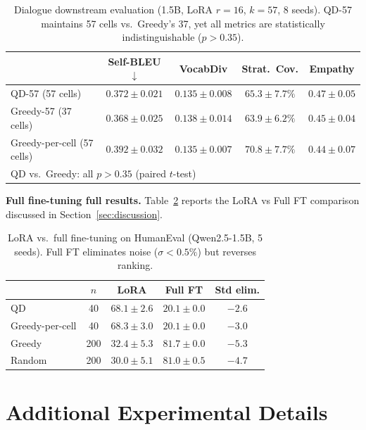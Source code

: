 \documentclass{article}
\theoremstyle{plain}
\theoremstyle{remark}
\begin{document}
\begin{table}[h]
\centering
\caption{Dialogue downstream evaluation (1.5B, LoRA $r{=}16$, $k{=}57$, 8 seeds). QD-57 maintains 57 cells vs.\ Greedy's 37, yet all metrics are statistically indistinguishable ($p{>}0.35$).}
\label{tab:dialogue_downstream}
\begin{tabular}{lcccc}
\toprule
 & \textbf{Self-BLEU}$\downarrow$ & \textbf{VocabDiv} & \textbf{Strat.\ Cov.} & \textbf{Empathy} \\
\midrule
QD-57 (57 cells) & $0.372 \pm 0.021$ & $0.135 \pm 0.008$ & $65.3 \pm 7.7\%$ & $0.47 \pm 0.05$ \\
Greedy-57 (37 cells) & $0.368 \pm 0.025$ & $0.138 \pm 0.014$ & $63.9 \pm 6.2\%$ & $0.45 \pm 0.04$ \\
Greedy-per-cell (57 cells) & $0.392 \pm 0.032$ & $0.135 \pm 0.007$ & $70.8 \pm 7.7\%$ & $0.44 \pm 0.07$ \\
\midrule
\multicolumn{5}{l}{\footnotesize QD vs.\ Greedy: all $p{>}0.35$ (paired $t$-test)} \\
\bottomrule
\end{tabular}
\end{table}

\textbf{Full fine-tuning full results.}
Table~\ref{tab:fullft} reports the LoRA vs Full FT comparison discussed in Section~\ref{sec:discussion}.

\begin{table}[h]
\centering
\caption{LoRA vs.\ full fine-tuning on HumanEval (Qwen2.5-1.5B, 5 seeds). Full FT eliminates noise ($\sigma{<}0.5\%$) but reverses ranking.}
\label{tab:fullft}
\begin{tabular}{lcccc}
\toprule
 & $n$ & \textbf{LoRA} & \textbf{Full FT} & \textbf{Std elim.} \\
\midrule
QD & 40 & $68.1 \pm 2.6$ & $20.1 \pm 0.0$ & $-2.6$ \\
Greedy-per-cell & 40 & $68.3 \pm 3.0$ & $20.1 \pm 0.0$ & $-3.0$ \\
Greedy & 200 & $32.4 \pm 5.3$ & $81.7 \pm 0.0$ & $-5.3$ \\
Random & 200 & $30.0 \pm 5.1$ & $81.0 \pm 0.5$ & $-4.7$ \\
\bottomrule
\end{tabular}
\end{table}

\section{Additional Experimental Details}
\label{sec:app_exp}
\end{document}
